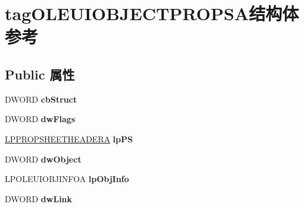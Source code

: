 \hypertarget{structtag_o_l_e_u_i_o_b_j_e_c_t_p_r_o_p_s_a}{}\section{tag\+O\+L\+E\+U\+I\+O\+B\+J\+E\+C\+T\+P\+R\+O\+P\+S\+A结构体 参考}
\label{structtag_o_l_e_u_i_o_b_j_e_c_t_p_r_o_p_s_a}
\subsection*{Public 属性}
\begin{DoxyCompactItemize}
\item 
\mbox{\label{structtag_o_l_e_u_i_o_b_j_e_c_t_p_r_o_p_s_a_ab1bf9b55631f0ea3a83aac4381cd3939}} 
D\+W\+O\+RD {\bfseries cb\+Struct}
\item 
\mbox{\label{structtag_o_l_e_u_i_o_b_j_e_c_t_p_r_o_p_s_a_aff45153b9615513b3dcbd96fbd8051b5}} 
D\+W\+O\+RD {\bfseries dw\+Flags}
\item 
\mbox{\label{structtag_o_l_e_u_i_o_b_j_e_c_t_p_r_o_p_s_a_a1b088f19353a7fa3c62fd622be336c9e}} 
\hyperlink{struct___p_r_o_p_s_h_e_e_t_h_e_a_d_e_r_a}{L\+P\+P\+R\+O\+P\+S\+H\+E\+E\+T\+H\+E\+A\+D\+E\+RA} {\bfseries lp\+PS}
\item 
\mbox{\label{structtag_o_l_e_u_i_o_b_j_e_c_t_p_r_o_p_s_a_a7864bb2455e7c278497930100d8c3175}} 
D\+W\+O\+RD {\bfseries dw\+Object}
\item 
\mbox{\label{structtag_o_l_e_u_i_o_b_j_e_c_t_p_r_o_p_s_a_a4810fbde4d1baf498e97e6042045eb15}} 
L\+P\+O\+L\+E\+U\+I\+O\+B\+J\+I\+N\+F\+OA {\bfseries lp\+Obj\+Info}
\item 
\mbox{\label{structtag_o_l_e_u_i_o_b_j_e_c_t_p_r_o_p_s_a_a3e9a8fa7cb09629e6544d17d45298c7a}} 
D\+W\+O\+RD {\bfseries dw\+Link}
\item 
\mbox{\label{structtag_o_l_e_u_i_o_b_j_e_c_t_p_r_o_p_s_a_a73375cc3d589b6ea80176f8ce449d502}} 

\end{DoxyCompactItemize}
